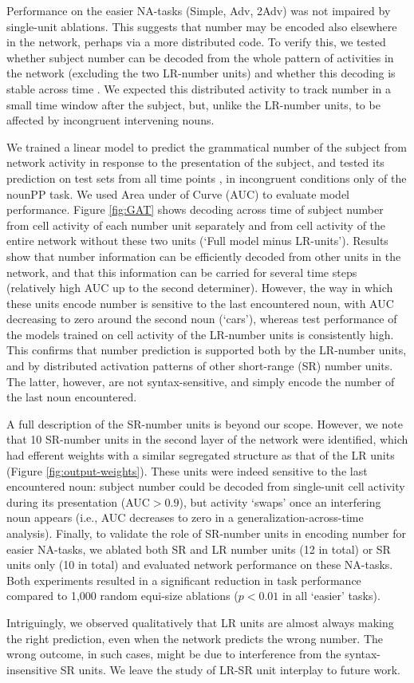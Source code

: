 Performance on the easier NA-tasks (Simple, Adv, 2Adv) was not
impaired by single-unit ablations. This suggests that number may be
encoded also elsewhere in the network, perhaps via a more distributed
code. To verify this, we tested whether subject number can be decoded from the whole
pattern of activities in the network (excluding the two LR-number units)
and whether this decoding is stable across time \cite[see][for similar
observations and related methods]{Giulianelli:etal:2018}. We expected
this distributed activity to track number in a
small time window after the subject, but, unlike the LR-number units,
to be affected by incongruent intervening nouns.

We trained a linear model to predict the grammatical number of the
subject from network activity in response to the presentation of the
subject, and tested its prediction on test sets from all time points
\cite{King:Dehaene:2014}, in incongruent conditions only of the nounPP
task. We used Area under of Curve (AUC) to evaluate model
performance. Figure \ref{fig:GAT} shows decoding across time of
subject number from cell activity of each number unit separately and
from cell activity of the entire network without these two units
(`Full model minus LR-units'). Results show that number information
can be efficiently decoded from other units in the network, and that
this information can be carried for several time steps (relatively
high AUC up to the second determiner). However, the way in which these
units encode number is sensitive to the last encountered noun, with
AUC decreasing to zero around the second noun (`cars'), whereas test
performance of the models trained on cell activity of the LR-number
units is consistently high. This confirms that number prediction is
supported both by the LR-number units, and by distributed activation
patterns of other short-range (SR) number units. The latter, however,
are not syntax-sensitive, and simply encode the number of the last
noun encountered.

A full description of the SR-number units is beyond our scope. However, we note that 10 SR-number units in the second layer of the
network were identified, which had efferent weights with a similar segregated
structure as that of the LR units (Figure
\ref{fig:output-weights}). These units were indeed sensitive to the last
encountered noun: subject number could be decoded from single-unit cell activity
during its presentation (AUC$>0.9$), but activity `swaps' once an
interfering noun appears (i.e., AUC decreases to zero in a
generalization-across-time analysis). Finally, to validate the role of SR-number units in encoding number for easier NA-tasks, we ablated both SR and LR number
units (12 in total) or SR units only (10 in total) and evaluated network performance on these NA-tasks. Both experiments resulted in a significant reduction in task performance compared to 1,000 random equi-size ablations ($p<0.01$ in all `easier' tasks).

Intriguingly, we observed qualitatively that LR units are almost
always making the right prediction, even when the network predicts the
wrong number. The wrong outcome, in such cases, might be due to
interference from the syntax-insensitive SR units. We leave the study of LR-SR
unit interplay to future work.

